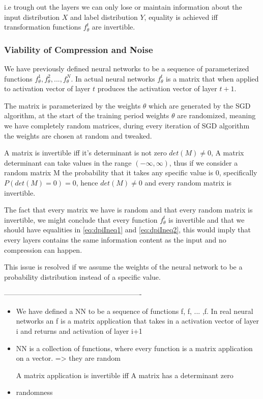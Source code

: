 i.e trough out the layers we can only lose or maintain information about the
input distribution $X$ and label distribution $Y$, equality is achieved iff
transformation functions $f_{\theta}^t$ are invertible.

\subsubsection{Viability of Compression and Noise}

We have previously defined neural networks to be a sequence of parameterized
functions $f_{\theta}^1, f_{\theta}^2, ...  ,f_{\theta}^N$. In actual neural
networks $f_\theta^t$ is a matrix that when applied to activation vector of
layer $t$ produces the activation vector of layer $t+1$.

The matrix is parameterized by the weights $\theta$ which are generated by the
SGD algorithm, at the start of the training period weights $\theta$ are
randomized, meaning we have completely random matrices, during every iteration
of SGD algorithm the weights are chosen at random and tweaked.

A matrix is invertible iff it's determinant is not zero $det(M) \neq 0$, A
matrix determinant can take values in the range $(-\infty, \infty)$, thus if we
consider a random matrix M the probability that it takes any specific value is
0, specifically $P(det(M) = 0) = 0$, hence $det(M) \neq 0$ and every random
matrix is invertible.

The fact that every matrix we have is random and that every random matrix is
invertible, 
we might conclude that every function $f_\theta^t$ is invertible and
that we should have equalities in \autoref{eq:dpiIneq1} and
\autoref{eq:dpiIneq2}, this would imply that every layers contains the same
information content as the input and no compression can happen.

This issue is resolved if we assume the weights of the neural network to be a
probability distribution instead of a specific value.





----------------------------------------------------------

\begin{itemize}
  \item{
      We have defined a NN to be a sequence of functions f, f, ... ,f. In real
      neural networks an f is a matrix application that takes in a activation
      vector of layer i and returns and activation of layer i+1
    }
  \item{
      NN is a collection of functions, where every function is a matrix
      application on a vector. => they are random 

      A matrix application is invertible iff A matrix has a determinant zero
    }
  \item{
      randomness
    }
\end{itemize}

